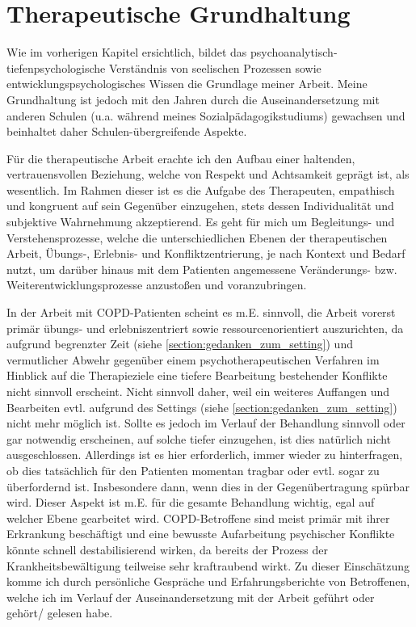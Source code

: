 \section{Therapeutische Grundhaltung} 
Wie im vorherigen Kapitel ersichtlich, bildet das psychoanalytisch-tiefenpsychologische Verständnis von seelischen Prozessen sowie entwicklungspsychologisches Wissen die Grundlage meiner Arbeit. Meine Grundhaltung ist jedoch mit den Jahren durch die Auseinandersetzung mit anderen Schulen (u.a. während meines Sozialpädagogikstudiums) gewachsen und beinhaltet daher Schulen-übergreifende Aspekte. 

Für die therapeutische Arbeit erachte ich den Aufbau einer haltenden, vertrauensvollen Beziehung, welche von Respekt und Achtsamkeit geprägt ist, als wesentlich. 
Im Rahmen dieser ist es die Aufgabe des Therapeuten, empathisch und kongruent auf sein Gegenüber einzugehen, stets dessen Individualität und subjektive Wahrnehmung akzeptierend. 
Es geht für mich um Begleitungs- und Verstehensprozesse, welche die unterschiedlichen Ebenen der therapeutischen Arbeit, Übungs-, Erlebnis- und Konfliktzentrierung, je nach Kontext und Bedarf nutzt, um darüber hinaus mit dem Patienten angemessene Veränderungs- bzw. Weiterentwicklungsprozesse anzustoßen und voranzubringen. 

In der Arbeit mit COPD-Patienten scheint es m.E. sinnvoll, die Arbeit vorerst primär übungs- und erlebniszentriert sowie ressourcenorientiert auszurichten, da aufgrund begrenzter Zeit (siehe \ref{section:gedanken_zum_setting}) und vermutlicher Abwehr gegenüber einem psychotherapeutischen Verfahren im Hinblick auf die Therapieziele eine tiefere Bearbeitung bestehender Konflikte nicht sinnvoll erscheint. Nicht sinnvoll daher, weil ein weiteres Auffangen und Bearbeiten evtl. aufgrund des Settings (siehe \ref{section:gedanken_zum_setting}) nicht mehr möglich ist. Sollte es jedoch im Verlauf der Behandlung sinnvoll oder gar notwendig erscheinen, auf solche tiefer einzugehen, ist dies natürlich nicht ausgeschlossen. Allerdings ist es hier erforderlich, immer wieder zu hinterfragen, ob dies tatsächlich für den Patienten momentan tragbar oder evtl. sogar zu überfordernd ist. Insbesondere dann, wenn dies in der Gegenübertragung spürbar wird. Dieser Aspekt ist m.E. für die gesamte Behandlung wichtig, egal auf welcher Ebene gearbeitet wird. COPD-Betroffene sind meist primär mit ihrer Erkrankung beschäftigt und eine bewusste Aufarbeitung psychischer Konflikte könnte schnell destabilisierend wirken, da bereits der Prozess der Krankheitsbewältigung teilweise sehr kraftraubend wirkt. Zu dieser Einschätzung komme ich durch persönliche Gespräche und Erfahrungsberichte von Betroffenen, welche ich im Verlauf der Auseinandersetzung mit der Arbeit geführt oder gehört/ gelesen habe. 

